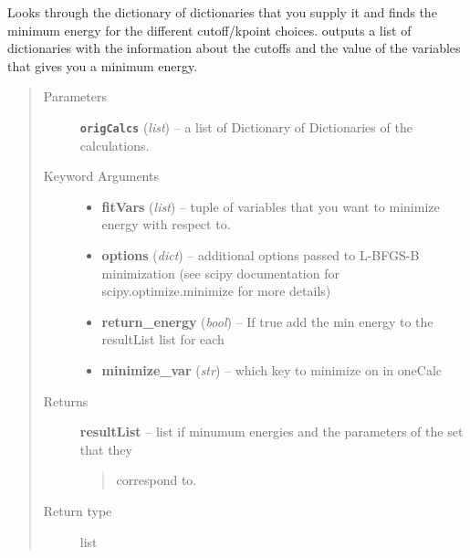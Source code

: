 \documentclass[letterpaper,10pt,english]{sphinxmanual}
\begin{document}
\begin{fulllineitems}
\label{pseudo:pseudo.__getMinimization}
Looks through the dictionary of dictionaries that you supply it and finds the minimum energy
for the different cutoff/kpoint choices. outputs a list of dictionaries with the information
about the cutoffs and the value of the variables that gives you a minimum energy.
\begin{quote}\begin{description}
\item[{Parameters}] \leavevmode
\textbf{\texttt{origCalcs}} (\emph{list}) -- a list of Dictionary of Dictionaries of the calculations.

\item[{Keyword Arguments}] \leavevmode\begin{itemize}
\item {} 
\textbf{fitVars} (\emph{list}) --
tuple of variables that you want to minimize energy with respect to.

\item {} 
\textbf{options} (\emph{dict}) --
additional options passed to L-BFGS-B minimization
(see scipy documentation for scipy.optimize.minimize for more details)

\item {} 
\textbf{return\_energy} (\emph{bool}) --
If true add the min energy to the resultList list for each

\item {} 
\textbf{minimize\_var} (\emph{str}) --
which key to minimize on in oneCalc

\end{itemize}

\item[{Returns}] \leavevmode

\textbf{resultList} --
list if minumum energies and the parameters of the set that they
\begin{quote}

correspond to.
\end{quote}


\item[{Return type}] \leavevmode
list

\end{description}\end{quote}

\end{fulllineitems}
\end{document}
